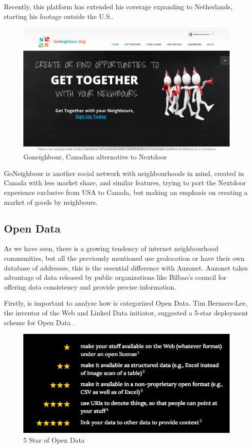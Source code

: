 \documentclass{DeustoFDP}
\begin{document}
Recently, this platform has extended his coverage expanding to Netherlands, starting his footage outside the U.S..

\begin{figure}[H]
\centering
\includegraphics[width=0.7\linewidth]{fig/goneighbor}
\caption[Goneighbour]{Goneighbour, Canadian alternative to Nextdoor}
\label{fig:goneighbor}
\end{figure}

GoNeighbour is another social network with neighbourhoods in mind, created in Canada with less market share, and similar features, trying to port the Nextdoor experience exclusive from USA to Canada, but making an emphasis on creating a market of goods by neighbours.

\subsection{Open Data}
As we have seen, there is a growing tendency of internet neighbourhood communities, but all the previously mentioned use geolocation or have their own database of addresses, this is the essential difference with Auzonet. Auzonet takes advantage of data released by public organizations like Bilbao's council for offering data consistency and provide precise information.

Firstly, is important to analyze how is categorized Open Data. Tim Bernsers-Lee, the inventor of the Web and Linked Data initiator, suggested a 5-star deployment scheme for Open Data \cite{ODStars}.

\begin{figure}[h]
\centering
\includegraphics[width=0.7\linewidth]{fig/5starod}
\caption[5 Star of Open Data]{5 Star of Open Data}
\label{fig:5starod}
\end{figure}
\end{document}
